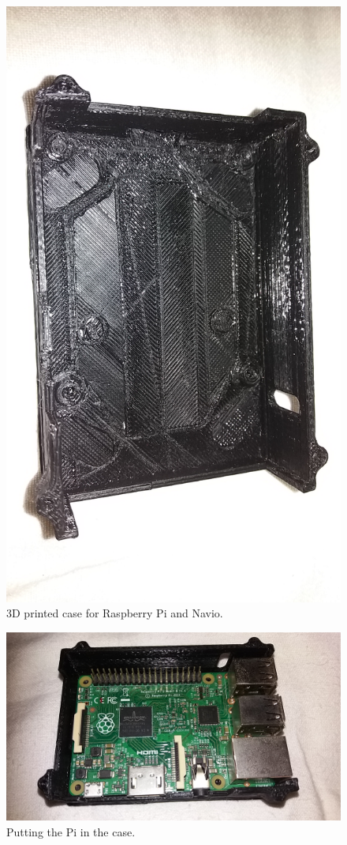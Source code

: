 \begin{figure}
\centering
\includegraphics[scale=0.1]{images/drone-build-3dcase.jpg}
\caption{3D printed case for Raspberry Pi and Navio.}
\label{fig:frame}
\end{figure}

\begin{figure}
\centering
\includegraphics[scale=0.1]{images/drone-build-3dcase-pi.jpg}
\caption{Putting the Pi in the case.}
\label{fig:frame}
\end{figure}


